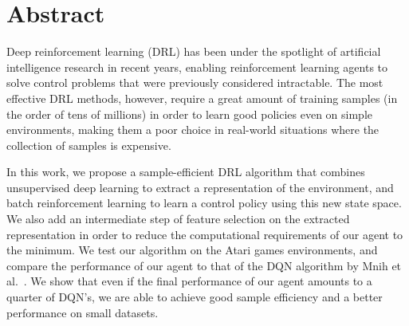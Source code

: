 \newpage
\chapter*{Abstract}


\vspace{0.5cm}

Deep reinforcement learning (DRL) has been under the spotlight of artificial 
intelligence research in recent years, enabling reinforcement learning agents 
to solve control problems that were previously considered intractable. 
The most effective DRL methods, however, require a great amount of training 
samples (in the order of tens of millions) in order to learn good policies
even on simple environments, making them a poor choice in real-world situations
where the collection of samples is expensive.

In this work, we propose a sample-efficient DRL algorithm that combines 
unsupervised deep learning to extract a representation of the environment, and 
batch reinforcement learning to learn a control policy using this new state 
space.
We also add an intermediate step of feature selection on the extracted 
representation in order to reduce the computational requirements of our agent to 
the minimum.
We test our algorithm on the Atari games environments, and compare the 
performance of our agent to that of the DQN algorithm by Mnih et al.\ \cite{mnih2015human}.
We show that even if the final performance of our agent amounts to a quarter of 
DQN's, we are able to achieve good sample efficiency and a better performance on
small datasets.